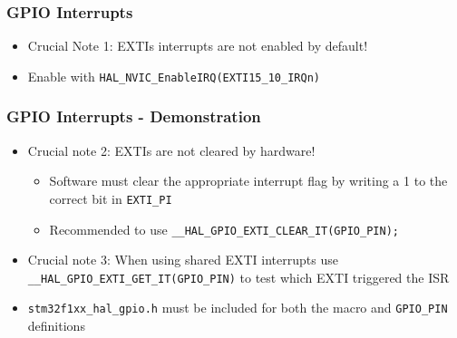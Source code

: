 \documentclass[14pt]{beamer}
\begin{document}
\begin{frame}[fragile]
\frametitle{GPIO Interrupts}
\begin{itemize}
\item Crucial Note 1: EXTIs interrupts are not enabled by default!
\item Enable with \texttt{HAL\_NVIC\_EnableIRQ(EXTI15\_10\_IRQn)}

\end{itemize}
\end{frame}

\begin{frame}[fragile]
\frametitle{GPIO Interrupts - Demonstration}
\begin{itemize}
\item Crucial note 2: EXTIs are not cleared by hardware!
\begin{itemize}
\item Software must clear the appropriate interrupt flag by writing a 1 to the correct bit in \texttt{EXTI\_PI}
\item Recommended to use \texttt{\_\_HAL\_GPIO\_EXTI\_CLEAR\_IT(GPIO\_PIN);}
\end{itemize}
\item Crucial note 3: When using shared EXTI interrupts use \texttt{\_\_HAL\_GPIO\_EXTI\_GET\_IT(GPIO\_PIN)} to test which EXTI triggered the ISR
\item \texttt{stm32f1xx\_hal\_gpio.h} must be included for both the macro and \texttt{GPIO\_PIN} definitions

\end{itemize}
\end{frame}
\end{document}
